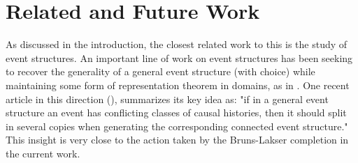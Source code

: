 \documentclass[hoptionsi,review,format=acmsmall]{acmart}
\newtheorem{lemma}[theorem]{Lemma}
\theoremstyle{definition}
\begin{document}












\section{Related and Future Work}

As discussed in the introduction, the closest related work to this is the study of event structures. An important line of work on event structures has been seeking to recover the generality of a general event structure (with choice) while maintaining some form of representation theorem in domains, as in \cite{nielsen1981petri}. One recent article in this direction (\cite{DBLP:journals/corr/abs-1802-03726}), summarizes its key idea as: "if in a general event structure an event has conflicting classes of causal histories, then it should split in several copies when generating the corresponding connected event structure." This insight is very close to the action taken by the Bruns-Lakser completion in the current work.
\end{document}
